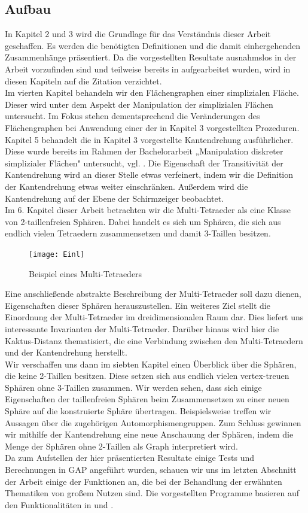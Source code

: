 \documentclass[12pt,titlepage,twoside,cleardoublepage]{article}
\theoremstyle{nummermitklammern}
\numberwithin{equation}{section}
\begin{document}
\subsection{Aufbau}
In Kapitel 2 und 3 wird die Grundlage für das Verständnis dieser Arbeit geschaffen. Es werden die benötigten Definitionen und die damit einhergehenden Zusammenhänge präsentiert. Da die vorgestellten Resultate ausnahmslos in der Arbeit \cite{simp} vorzufinden sind und teilweise bereits in \cite{Rey} aufgearbeitet wurden, wird in diesen Kapiteln auf die Zitation verzichtet.\\
Im vierten Kapitel behandeln wir den Flächengraphen einer simplizialen Fläche. Dieser wird unter dem Aspekt der Manipulation der simplizialen Flächen untersucht. Im Fokus stehen dementsprechend die Veränderungen des Flächengraphen bei Anwendung einer der in Kapitel 3 vorgestellten Prozeduren.\\
Kapitel 5 behandelt die in Kapitel 3 vorgestellte  Kantendrehung ausführlicher. Diese wurde bereits im Rahmen der Bachelorarbeit „Manipulation diskreter simplizialer Flächen"$ $
untersucht, vgl. \cite{Rey}. Die Eigenschaft der Transitivität der Kantendrehung wird an dieser Stelle etwas verfeinert, indem wir die Definition der Kantendrehung etwas weiter einschränken. Außerdem wird die Kantendrehung auf der Ebene der Schirmzeiger beobachtet.\\
Im 6. Kapitel dieser Arbeit betrachten wir die Multi-Tetraeder als eine Klasse von 2-taillenfreien Sphären. Dabei handelt es sich um Sphären, die sich aus endlich vielen Tetraedern zusammensetzen und damit 3-Taillen besitzen.
\begin{figure}[H]
\begin{center}
\texttt{[image: Einl]}
\end{center}
\caption{Beispiel eines Multi-Tetraeders}
\end{figure}
Eine anschließende abstrakte Beschreibung der Multi-Tetraeder soll dazu dienen, Eigenschaften dieser Sphären herauszustellen. Ein weiteres Ziel stellt die Einordnung der Multi-Tetraeder im dreidimensionalen Raum dar. Dies liefert uns interessante Invarianten der Multi-Tetraeder. Darüber hinaus wird hier die Kaktus-Distanz thematisiert, die eine Verbindung zwischen den Multi-Tetraedern und der Kantendrehung herstellt.\\
Wir verschaffen uns dann im siebten Kapitel einen Überblick über die Sphären, die keine 2-Taillen besitzen. Diese setzen sich aus endlich vielen vertex-treuen Sphären ohne 3-Taillen zusammen. Wir werden sehen, dass sich einige Eigenschaften der taillenfreien Sphären beim Zusammensetzen zu einer neuen Sphäre auf die konstruierte Sphäre übertragen. Beispielsweise treffen wir Aussagen über die zugehörigen Automorphismengruppen. Zum Schluss gewinnen wir mithilfe der Kantendrehung eine neue Anschauung der Sphären, indem die Menge der Sphären ohne 2-Taillen als Graph interpretiert wird.\\
Da zum Aufstellen der hier präsentierten Resultate einige Tests und Berechnungen in GAP angeführt wurden, schauen wir uns im letzten Abschnitt der Arbeit einige der Funktionen an, die bei der Behandlung der erwähnten Thematiken von großem Nutzen sind. Die vorgestellten Programme basieren auf den Funktionalitäten in \cite{gapsimp} und \cite{gap}. 
\end{document}
